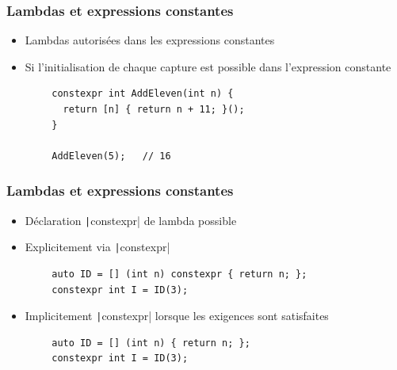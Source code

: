 \documentclass[C++.tex]{subfiles}
\begin{document}
\begin{frame}[fragile]
	\frametitle{Lambdas et expressions constantes}
	\begin{itemize}
		\item Lambdas autorisées dans les expressions constantes
		\item Si l'initialisation de chaque capture est possible dans l'expression constante
	\end{itemize}

	\begin{verbatim}
		constexpr int AddEleven(int n) {
		  return [n] { return n + 11; }();
		}

		AddEleven(5);   // 16
	\end{verbatim}
\end{frame}

\begin{frame}[fragile]
	\frametitle{Lambdas et expressions constantes}
	\begin{itemize}
		\item Déclaration \texttt|constexpr| de lambda possible 
		\item Explicitement via \texttt|constexpr|
	\end{itemize}

	\begin{verbatim}
		auto ID = [] (int n) constexpr { return n; };
		constexpr int I = ID(3);
	\end{verbatim}

	\begin{itemize}
		\item Implicitement \texttt|constexpr| lorsque les exigences sont satisfaites
	\end{itemize}


	\begin{verbatim}
		auto ID = [] (int n) { return n; };
		constexpr int I = ID(3);
	\end{verbatim}
\end{frame}
\end{document}
